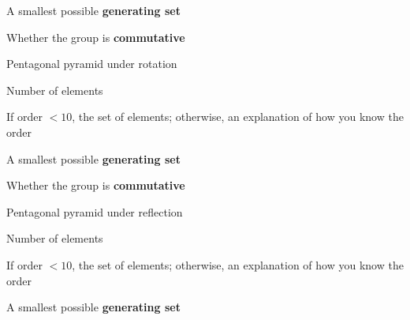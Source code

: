 \documentclass[../gatm_answers.tex]{subfiles}
\begin{document}
\begin{inner_problem}
\item A smallest possible \textbf{generating set}
\end{inner_problem}

\begin{inner_problem}
\item Whether the group is \textbf{commutative}
\end{inner_problem}

\begin{outer_problem}
\item Pentagonal pyramid under rotation
\end{outer_problem}

\begin{inner_problem}[start=1]
\item Number of elements
\end{inner_problem}

\begin{inner_problem}
\item If order $< 10$, the set of elements; otherwise, an explanation of how you know the order
\end{inner_problem}

\begin{inner_problem}
\item A smallest possible \textbf{generating set}
\end{inner_problem}

\begin{inner_problem}
\item Whether the group is \textbf{commutative}
\end{inner_problem}

\begin{outer_problem}
\item Pentagonal pyramid under reflection
\end{outer_problem}

\begin{inner_problem}[start=1]
\item Number of elements
\end{inner_problem}

\begin{inner_problem}
\item If order $< 10$, the set of elements; otherwise, an explanation of how you know the order
\end{inner_problem}

\begin{inner_problem}
\item A smallest possible \textbf{generating set}
\end{inner_problem}
\end{document}
